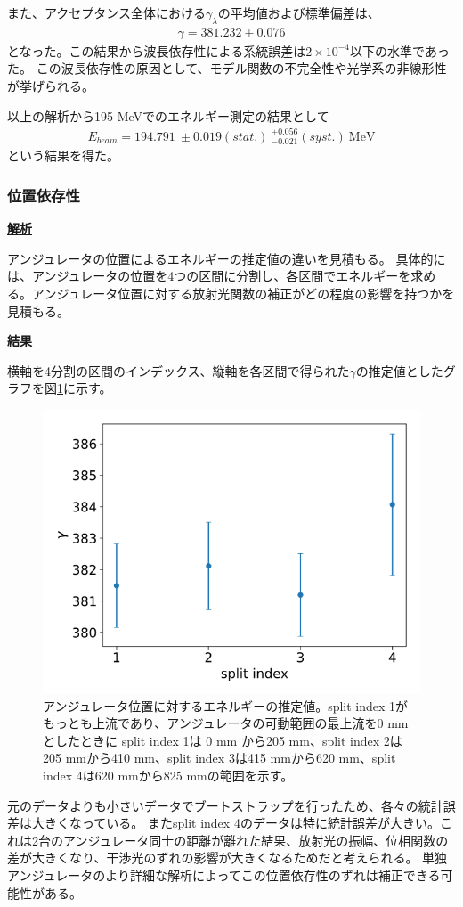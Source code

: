 \documentclass[a4paper,11pt,uplatex]{jsbook}
\begin{document}
また、アクセプタンス全体における$\gamma_\lambda$の平均値および標準偏差は、
\begin{eqnarray}
  \gamma = 381.232 \pm 0.076
\end{eqnarray}
となった。この結果から波長依存性による系統誤差は$2\times10^{-4}$以下の水準であった。
この波長依存性の原因として、モデル関数の不完全性や光学系の非線形性が挙げられる。

以上の解析から195 MeVでのエネルギー測定の結果として
\begin{align}
  E_{beam} = 194.791 ~\pm 0.019(stat.) ~^{+0.056}_{-0.021}(syst.)~\text{MeV}
\end{align}
という結果を得た。

\subsubsection{位置依存性}
\noindent \textbf{\underline{解析}}\par
アンジュレータの位置によるエネルギーの推定値の違いを見積もる。
具体的には、アンジュレータの位置を4つの区間に分割し、各区間でエネルギーを求める。アンジュレータ位置に対する放射光関数の補正がどの程度の影響を持つかを見積もる。

\noindent \textbf{\underline{結果}}\par
横軸を4分割の区間のインデックス、縦軸を各区間で得られた$\gamma$の推定値としたグラフを図\ref{posdep}に示す。
\begin{figure}[H]
  \centering
  \includegraphics[width=0.8\linewidth]{image/4-posdep.png}
  \caption[アンジュレータ位置に対するエネルギーの推定値]{アンジュレータ位置に対するエネルギーの推定値。split index 1がもっとも上流であり、アンジュレータの可動範囲の最上流を0 mm としたときに
  split index 1は 0 mm から205 mm、split index 2は205 mmから410 mm、split index 3は415 mmから620 mm、split index 4は620 mmから825 mmの範囲を示す。}\label{posdep}
\end{figure}
元のデータよりも小さいデータでブートストラップを行ったため、各々の統計誤差は大きくなっている。
またsplit index 4のデータは特に統計誤差が大きい。これは2台のアンジュレータ同士の距離が離れた結果、放射光の振幅、位相関数の差が大きくなり、干渉光のずれの影響が大きくなるためだと考えられる。
単独アンジュレータのより詳細な解析によってこの位置依存性のずれは補正できる可能性がある。
\end{document}
